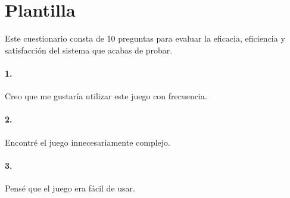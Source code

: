 
\pagestyle{fancy}
\fancyhead[LE,RO]{\thepage}
\fancyhead[LO]{\nouppercase{\rightmark}}

\label{sec:apendice:Custionarios}
\minitoc




\section{Plantilla}

Este cuestionario consta de 10 preguntas para evaluar la eficacia, eficiencia y satisfacción del sistema que acabas de probar. 

\paragraph{1.} Creo que me gustaría utilizar este juego con frecuencia.

\begin{table}[H]
	\centering
\end{table}

\paragraph{2.} Encontré el juego innecesariamente complejo.

\begin{table}[H]
	\centering
\end{table}

\paragraph{3.} Pensé que el juego era fácil de usar.


